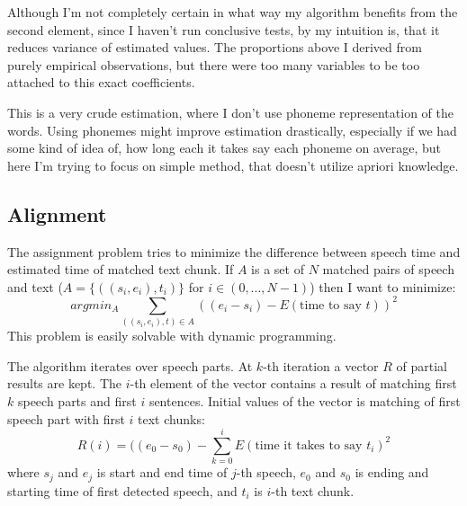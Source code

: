 \documentclass[12pt,a4paper,english]{article}
\begin{document}
Although I'm not completely certain in what way my algorithm benefits from the second element,
since I haven't run conclusive tests, by my intuition is, that it reduces variance of estimated values. \newline
The proportions above I derived from purely empirical observations, but there were too many variables to be
too attached to this exact coefficients. \newline

This is a very crude estimation, where I don't use phoneme representation of the words. Using phonemes might improve estimation drastically,
especially if we had some kind of idea of, how long each it takes say each phoneme on average, but here I'm trying to focus on simple method, that doesn't utilize apriori knowledge.

\newpage

\subsection{Alignment}

The assignment problem tries to minimize the difference between speech time and estimated time of matched text chunk.
If $A$ is a set of $N$ matched pairs of speech and text ($A = \{((s_i, e_i), t_i)\}$ for $i \in (0, ..., N-1)$) then I want to minimize:
\begin{equation}
    argmin_A \sum_{((s_i, e_i), t) \in A} ((e_i - s_i) - E(\text{time to say $t$}))^2
\end{equation}
This problem is easily solvable with dynamic programming. \newline

The algorithm iterates over speech parts. \newline
At $k$-th iteration a vector $R$ of partial results are kept. The $i$-th element of the vector contains a result of matching first $k$ speech parts and first $i$ sentences. \newline
Initial values of the vector is matching of first speech part with first $i$ text chunks:
\begin{equation}
    R(i) = ((e_0 - s_0) - \sum_{k = 0}^i E(\text{time it takes to say $t_i$})^2
\end{equation}
where $s_j$ and $e_j$ is start and end time of $j$-th speech, \newline
$e_0$ and $s_0$ is ending and starting time of first detected speech,
and $t_i$ is $i$-th text chunk. \newline
               
\end{document}
